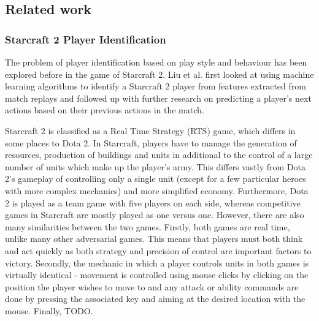 \documentclass[Report.tex]{subfiles}
\begin{document}
\subsection{Related work}

\subsubsection{Starcraft 2 Player Identification}
The problem of player identification based on play style and behaviour has been explored before in the game of Starcraft 2. Liu et al. \cite{starcraft-identification} first looked at using machine learning algorithms to identify a Starcraft 2 player from features extracted from match replays and followed up with further research \cite{starcraft-actions} on predicting a player's next actions based on their previous actions in the match. 

Starcraft 2 is classified as a Real Time Strategy (RTS) game, which differs in some places to Dota 2. In Starcraft, players have to manage the generation of resources, production of buildings and units in additional to the control of a large number of units which make up the player's army. This differs vastly from Dota 2's gameplay of controlling only a single unit (except for a few particular heroes with more complex mechanics) and more simplified economy. Furthermore, Dota 2 is played as a team game with five players on each side, whereas competitive games in Starcraft are mostly played as one versus one. However, there are also many similarities between the two games. Firstly, both games are real time, unlike many other adversarial games. This means that players must both think and act quickly as both strategy and precision of control are important factors to victory. Secondly, the mechanic in which a player controls units in both games is virtually identical - movement is controlled using mouse clicks by clicking on the position the player wishes to move to and any attack or ability commands are done by pressing the associated key and aiming at the desired location with the mouse. Finally, TODO. %
\end{document}
